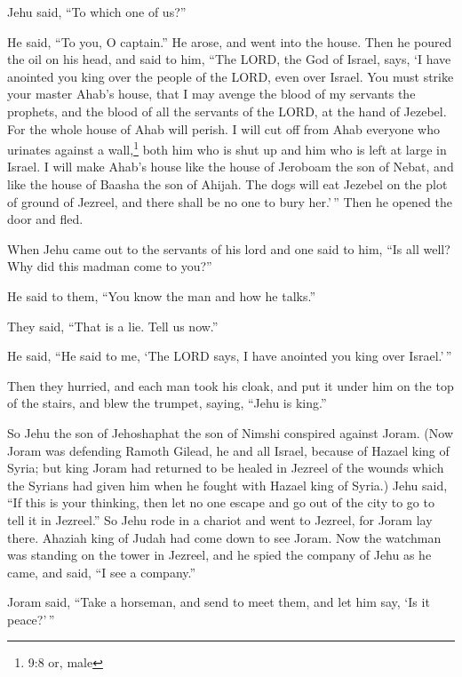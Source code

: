 Jehu said, ``To which one of us?''

He said, ``To you, O captain.''  He arose, and went into the
house. Then he poured the oil on his head, and said to him, ``The LORD,
the God of Israel, says, `I have anointed you king over the people of
the LORD, even over Israel.  You must strike your master
Ahab's house, that I may avenge the blood of my servants the prophets,
and the blood of all the servants of the LORD, at the hand of Jezebel.
 For the whole house of Ahab will perish. I will cut off
from Ahab everyone who urinates against a wall,\footnote{9:8 or, male}
both him who is shut up and him who is left at large in Israel.
 I will make Ahab's house like the house of Jeroboam the son
of Nebat, and like the house of Baasha the son of Ahijah. 
The dogs will eat Jezebel on the plot of ground of Jezreel, and there
shall be no one to bury her.'\,'' Then he opened the door and fled.

 When Jehu came out to the servants of his lord and one
said to him, ``Is all well? Why did this madman come to you?''

He said to them, ``You know the man and how he talks.''

 They said, ``That is a lie. Tell us now.''

He said, ``He said to me, `The LORD says, I have anointed you king over
Israel.'\,''

 Then they hurried, and each man took his cloak, and put it
under him on the top of the stairs, and blew the trumpet, saying, ``Jehu
is king.''

 So Jehu the son of Jehoshaphat the son of Nimshi conspired
against Joram. (Now Joram was defending Ramoth Gilead, he and all
Israel, because of Hazael king of Syria;  but king Joram
had returned to be healed in Jezreel of the wounds which the Syrians had
given him when he fought with Hazael king of Syria.) Jehu said, ``If
this is your thinking, then let no one escape and go out of the city to
go to tell it in Jezreel.''  So Jehu rode in a chariot and
went to Jezreel, for Joram lay there. Ahaziah king of Judah had come
down to see Joram.  Now the watchman was standing on the
tower in Jezreel, and he spied the company of Jehu as he came, and said,
``I see a company.''

Joram said, ``Take a horseman, and send to meet them, and let him say,
`Is it peace?'\,''

